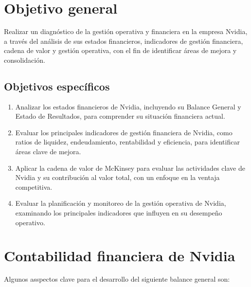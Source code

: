 \documentclass{article}
\newenvironment{objetivoGeneral}{}{}
\begin{document}
\begin{objetivoGeneral}
  \section{Objetivo general}

  Realizar un diagnóstico de la gestión operativa y financiera en la empresa Nvidia, a través del análisis de sus estados financieros, indicadores de gestión financiera, cadena de valor y gestión operativa, con el fin de identificar áreas de mejora y consolidación.
  
  \subsection{Objetivos específicos}
  
  \begin{enumerate}
    \item Analizar los estados financieros de Nvidia, incluyendo su Balance General y Estado de Resultados, para comprender su situación financiera actual.
    \item Evaluar los principales indicadores de gestión financiera de Nvidia, como ratios de liquidez, endeudamiento, rentabilidad y eficiencia, para identificar áreas clave de mejora.
    \item Aplicar la cadena de valor de McKinsey para evaluar las actividades clave de Nvidia y su contribución al valor total, con un enfoque en la ventaja competitiva.
    \item Evaluar la planificación y monitoreo de la gestión operativa de Nvidia, examinando los principales indicadores que influyen en su desempeño operativo.
  \end{enumerate}
\end{objetivoGeneral}

\newpage

\section{Contabilidad financiera de Nvidia}

Algunos asspectos clave para el desarrollo del siguiente balance general son:
\end{document}
